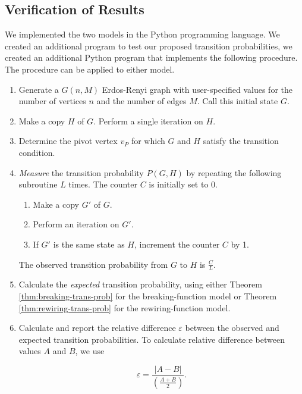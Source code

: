 \documentclass[a4paper,10pt]{article}
\title{}
\author{}
\begin{document}
\maketitle

\subsection{Verification of Results}

We implemented the two models in the Python programming language. We created an additional program to test our proposed transition probabilities, we created an additional Python program that implements the following procedure. The procedure can be applied to either model.

\begin{enumerate}
 \item Generate a $G(n, M)$ Erdos-Renyi graph with user-specified values for the number of vertices $n$ and the number of edges $M$. Call this initial state $G$.
 \item Make a copy $H$ of $G$. Perform a single iteration on $H$.
 \item Determine the pivot vertex $v_P$ for which $G$ and $H$ satisfy the transition condition.
 \item \emph{Measure} the transition probability $P(G, H)$ by repeating the following subroutine $L$ times. The counter $C$ is initially set to 0.

    \begin{enumerate}
      \item Make a copy $G'$ of $G$.
      \item Perform an iteration on $G'$.
      \item If $G'$ is the same state as $H$, increment the counter $C$ by 1.
    \end{enumerate}

  The observed transition probability from $G$ to $H$ is $\frac{C}{L}$.

 \item Calculate the \emph{expected} transition probability, using either Theorem \ref{thm:breaking-trans-prob} for the breaking-function model or Theorem \ref{thm:rewiring-trans-prob} for the rewiring-function model.

 \item Calculate and report the relative difference $\varepsilon$ between the observed and expected transition probabilities. To calculate relative difference between values $A$ and $B$, we use

 \begin{equation}
  \label{eqn:relative-difference}
  \varepsilon = \frac{|A - B|}{(\frac{A + B}{2})}.
 \end{equation}

\end{enumerate}
\end{document}
